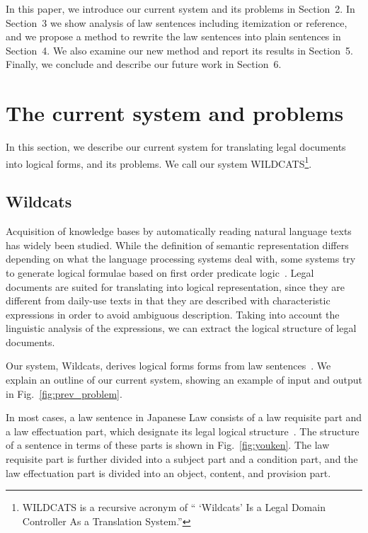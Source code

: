 \documentclass[english]{jnlp_1.4}
\begin{document}
In this paper, we introduce our current system and its problems in
Section~2. In Section~3 we show analysis of
law sentences including itemization or reference, and we propose
a method to rewrite the law sentences into plain sentences in
Section~4. 
We also examine our new method and report its results in Section~5. 
Finally, we conclude and describe our future work in Section~6.


\section{The current system and problems}

In this section, we describe our current system for translating legal
documents into logical forms, and its problems. We call our
system WILDCATS\footnote{WILDCATS is a recursive acronym of `` `Wildcats' Is a Legal
Domain Controller As a Translation System.''}.

\subsection{Wildcats}

Acquisition of knowledge bases by automatically reading natural language
texts has widely been studied.
While the definition of semantic representation differs depending on
what the language processing systems deal with, some systems try to
generate logical formulae based on first order predicate
logic~\cite{hobbs88,mulkar07learning,mulkar07ijcai}.
Legal documents are suited for translating into logical representation, since 
they are different from daily-use texts in that they are
described with characteristic expressions in order to avoid ambiguous
description. 
Taking into account the linguistic analysis of the expressions, we can
extract the logical structure of legal documents.

Our system, Wildcats, derives logical forms forms from law sentences~\cite{nakamura07jurisin}.
We explain an outline of our current system, showing an example of input and output in Fig.~\ref{fig:prev_problem}.

In most cases, a law sentence in Japanese Law consists of a law
requisite part 
and a law effectuation part, which designate its legal logical
structure~\cite{tanaka93,nagai95}.
The structure of a sentence in terms of these parts is shown in
Fig.~\ref{fig:youken}.
The law requisite part is further divided into a subject part and a
condition part, and the law effectuation part is divided into an object,
content, and provision part.
\end{document}

